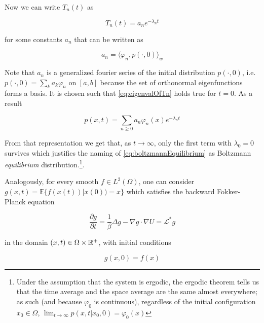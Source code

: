 Now we can write $T_n(t)$ as

\begin{equation}\label{eq:eigenvalOfTn}
T_n(t) = a_n e^{-\lambda_n t}
\end{equation}

for some constants $a_n$ that can be written as

\begin{equation*}
a_n = \langle \varphi_n, p(\cdot, 0) \rangle_w
\end{equation*}

Note that $a_n$ is a generalized fourier series of the initial distribution $p(\cdot, 0)$, i.e. $p(\cdot, 0) = \sum_k a_k \varphi_n$ on $[a,b]$ because the set of orthonormal eigenfunctions forms a basis. It is chosen such that \eqref{eq:eigenvalOfTn} holds true for $t=0$. As a result

\begin{equation}\label{eq:decompositionProbDistributionfFPO}
p(x,t) = \sum_{n\geq 0} a_n \varphi_n(x) e^{-\lambda_n t}
\end{equation}

From that representation we get that, as $t\rightarrow \infty$, only the first term with $\lambda_0 = 0$ survives which justifies the naming of \eqref{eq:boltzmannEquilibrium} as Boltzmann \textit{equilibrium} distribution.\footnote{Under the assumption that the system is ergodic, the ergodic theorem tells us that the time average and the space average are the same almost everywhere; as such (and because $\varphi_0$ is continuous), regardless of the initial configuration $x_0\in\Omega$, $\lim_{t\rightarrow\infty} p(x,t | x_0, 0) = \varphi_0(x)$}.

Analogously, for every smooth $f\in L^2(\Omega)$, one can consider $g(x,t) = \mathbb{E}\{f(x(t)) | x(0) ) = x \}$ which satisfies the backward Fokker-Planck equation

\begin{equation*}
\frac{\partial g}{\partial t} = \frac{1}{\beta}\Delta g - \nabla g \cdot\nabla U = \mathcal{L}^*g
\end{equation*}

in the domain $(x,t)\in \Omega\times\mathbb{R}^+$, with initial conditions

\begin{equation*}
g(x,0)=f(x)
\end{equation*}


